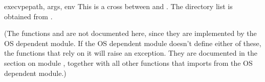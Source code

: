 \begin{funcdesc}{execvpe}{path, args, env}
This is a cross between  and .
The directory list is obtained from .
\end{funcdesc}

(The functions  and  are not
documented here, since they are implemented by the OS dependent
module.  If the OS dependent module doesn't define either of these,
the functions that rely on it will raise an exception.  They are
documented in the section on module , together with all
other functions that  imports from the OS dependent module.)
